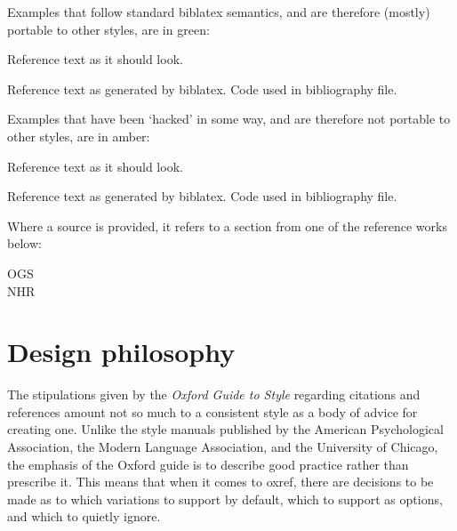 \documentclass[extrafontsizes,11pt,a4paper,oneside]{memoir}
\newcommand{\booksym}{\makebox[1em][c]{\faicon{book}}}
\newcommand{\cogsym}{\makebox[1em][c]{\faicon{cog}}}
\begin{document}
Examples that follow standard \textsf{biblatex} semantics, and are therefore
(mostly) portable to other styles, are in green:

\begin{tcolorbox}%
  [bicolor
  ,colframe = ok
  ,colback = ok!5!white
  ,colbacklower = white
  ,fontlower = \footnotesize\ttfamily
  ,overlay = {\node[anchor=south east,text=teal] at (frame.south east) {Source};}
  ]
  \hangfrom{\booksym\space} Reference text as it should look.\par
  \hangfrom{\cogsym\space} Reference text as generated by \textsf{biblatex}.
  \tcblower
  Code used in bibliography file.
\end{tcolorbox}

Examples that have been ‘hacked’ in some way, and are therefore not portable
to other styles, are in amber:

\begin{tcolorbox}%
  [bicolor
  ,colframe = hacked
  ,colback = hacked!5!white
  ,colbacklower = white
  ,fontlower = \footnotesize\ttfamily
  ,overlay = {\node[anchor=south east,text=teal] at (frame.south east) {Source};}
  ]
  \hangfrom{\booksym\space} Reference text as it should look.\par
  \hangfrom{\cogsym\space} Reference text as generated by \textsf{biblatex}.
  \tcblower
  Code used in bibliography file.
\end{tcolorbox}

Where a source is provided, it refers to a section from one of the reference works below:

\begin{description}
\item[OGS]

\item[NHR]
\end{description}

\section{Design philosophy}

The stipulations given by the \emph{Oxford Guide to Style} regarding citations and references
amount not so much to a consistent style as a body of advice for creating one.
Unlike the style manuals published by the American Psychological Association,
the Modern Language Association, and the University of Chicago,
the emphasis of the Oxford guide is to describe good practice rather than prescribe it.
This means that when it comes to \textsf{oxref}, there are decisions to be made
as to which variations to support by default, which to support as options,
and which to quietly ignore.
\end{document}
